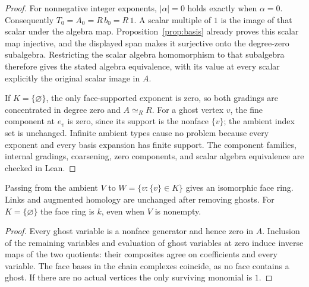 \begin{proof}
For nonnegative integer exponents, $|\alpha|=0$ holds exactly when
$\alpha=0$. Consequently $T_0=A_0=R\,b_0=R\,1$. A scalar multiple of $1$
is the image of that scalar under the algebra map. Proposition~\ref{prop:basis}
already proves this scalar map injective, and the displayed span makes it
surjective onto the degree-zero subalgebra. Restricting the scalar algebra
homomorphism to that subalgebra therefore gives the stated algebra
equivalence, with its value at every scalar explicitly the original scalar
image in $A$.

If $K=\{\varnothing\}$, the only face-supported exponent is zero, so both
gradings are concentrated in degree zero and $A\simeq_R R$. For a ghost
vertex $v$, the fine component at $e_v$ is zero, since its support is the
nonface $\{v\}$; the ambient index set is unchanged. Infinite ambient types
cause no problem because every exponent and every basis expansion has finite
support. The component families, internal gradings, coarsening, zero
components, and scalar algebra equivalence are checked in Lean.
\end{proof}

\begin{proposition}\label{prop:ghost}
Passing from the ambient $V$ to $W=\{v:\{v\}\in K\}$ gives an isomorphic
face ring. Links and augmented homology are unchanged after removing ghosts.
For $K=\{\varnothing\}$ the face ring is $k$, even when $V$ is nonempty.
\end{proposition}
\begin{proof}
Every ghost variable is a nonface generator and hence zero in $A$. Inclusion
of the remaining variables and evaluation of ghost variables at zero induce
inverse maps of the two quotients: their composites agree on coefficients
and every variable. The face bases in the chain complexes coincide, as no
face contains a ghost. If there are no actual vertices the only surviving
monomial is $1$.
\end{proof}

